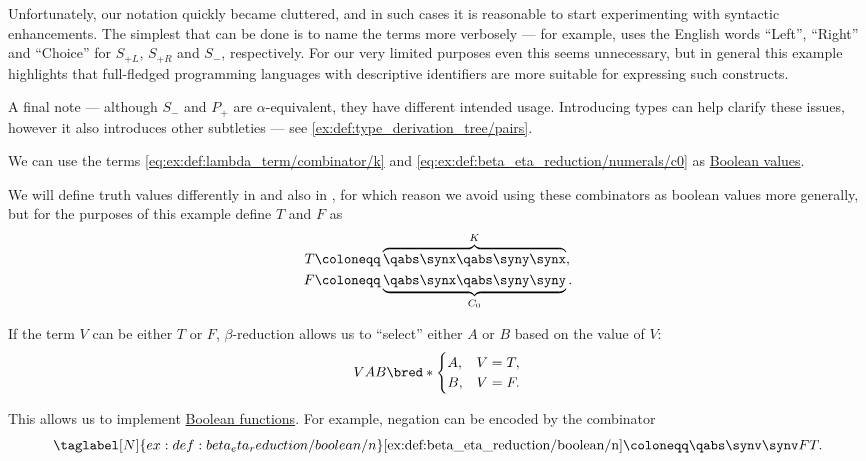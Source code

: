 \begin{example}
\begin{thmenum}
    Unfortunately, our notation quickly became cluttered, and in such cases it is reasonable to start experimenting with syntactic enhancements. The simplest that can be done is to name the terms more verbosely --- for example, \cite{MathOF:product_type_in_simply_typed_lambda_terms} uses the English words \enquote{Left}, \enquote{Right} and \enquote{Choice} for \( S_{+L} \), \( S_{+R} \) and \( S_- \), respectively. For our very limited purposes even this seems unnecessary, but in general this example highlights that full-fledged programming languages with descriptive identifiers are more suitable for expressing such constructs.

    A final note --- although \( S_- \) and \( P_+ \) are \( \alpha \)-equivalent, they have different intended usage. Introducing types can help clarify these issues, however it also introduces other subtleties --- see \cref{ex:def:type_derivation_tree/pairs}.

     We can use the terms \ref{eq:ex:def:lambda_term/combinator/k} and \ref{eq:ex:def:beta_eta_reduction/numerals/c0} as \hyperref[def:truth_value_algebra]{Boolean values}.

    We will define truth values differently in  and also in , for which reason we avoid using these combinators as boolean values more generally, but for the purposes of this example define \( T \) and \( F \) as
    \begin{align*}
      T &\coloneqq \overbrace{\qabs \synx \qabs \syny \synx}^K, \\
      F &\coloneqq \underbrace{\qabs \synx \qabs \syny \syny}_{C_0}.
    \end{align*}

    If the term \( V \) can be either \( T \) or \( F \), \( \beta \)-reduction allows us to \enquote{select} either \( A \) or \( B \) based on the value of \( V \):
    \begin{equation}\label{ex:def:beta_eta_reduction/boolean/if}
      VAB \bred* \begin{cases}
        A, &V = T, \\
        B, &V = F.
      \end{cases}
    \end{equation}

    This allows us to implement \hyperref[def:boolean_function]{Boolean functions}. For example, negation can be encoded by the combinator
    \begin{equation*}\taglabel[N]{ex:def:beta_eta_reduction/boolean/n}
      \ref{ex:def:beta_eta_reduction/boolean/n} \coloneqq \qabs \synv \synv F T.
    \end{equation*}


\end{thmenum}
\end{example}
